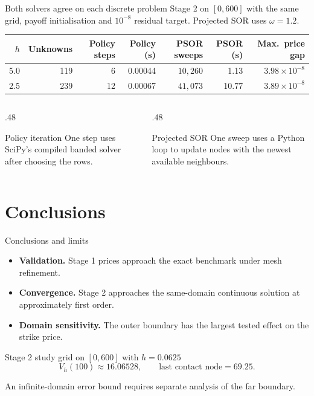 \documentclass[aspectratio=169,11pt]{beamer}
\begin{document}
\begin{frame}[t]{Both solvers agree on each discrete problem}
\small
Stage 2 on \([0,600]\) with the same grid, payoff initialisation and
\(10^{-8}\) residual target. Projected SOR uses \(\omega=1.2\).

\medskip
\begin{center}
\setlength{\tabcolsep}{4pt}
\begin{tabular}{@{}rrrrrrr@{}}
\toprule
\(h\) & Unknowns & Policy steps & Policy (s) & PSOR sweeps & PSOR (s) & Max.\ price gap \\
\midrule
5.0 & 119 & 6  & 0.00044 & \(10{,}260\) & 1.13  & \(3.98\times10^{-8}\) \\
2.5 & 239 & 12 & 0.00067 & \(41{,}073\) & 10.77 & \(3.89\times10^{-8}\) \\
\bottomrule
\end{tabular}
\end{center}

\begin{columns}[T,onlytextwidth]
\begin{column}{.48\textwidth}
\begin{block}{Policy iteration}
\footnotesize
One step uses SciPy's compiled banded solver after choosing the rows.
\end{block}
\end{column}
\begin{column}{.48\textwidth}
\begin{block}{Projected SOR}
\footnotesize
One sweep uses a Python loop to update nodes with the newest available neighbours.
\end{block}
\end{column}
\end{columns}

\end{frame}
\section{Conclusions}

\begin{frame}[t]{Conclusions and limits}
\begin{itemize}
\item \textbf{Validation.} Stage 1 prices approach the exact benchmark under mesh refinement.
\item \textbf{Convergence.} Stage 2 approaches the same-domain continuous solution at approximately first order.
\item \textbf{Domain sensitivity.} The outer boundary has the largest tested effect on the strike price.
\end{itemize}

\begin{block}{Stage 2 study grid on $[0,600]$ with $h=0.0625$}
\[
 V_h(100)\approx16.06528,\qquad
 \text{last contact node}=69.25.
\]
\end{block}
An infinite-domain error bound requires separate analysis of the far boundary.

\end{frame}
\end{document}
